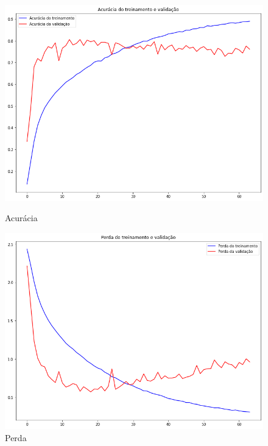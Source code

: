 \documentclass[12pt]{article}
\begin{document}
\begin{figure}[!htb]
  \begin{minipage}{.47\textwidth}
    \centering
    \includegraphics[width=1.1\linewidth]{experiments/default_aug_64/accuracy.png}
    \caption{Acurácia}\label{fig:experiment_default_aug_64_accuracy}
  \end{minipage}\hfill
  \begin{minipage}{.47\textwidth}
    \centering
    \includegraphics[width=1.1\linewidth]{experiments/default_aug_64/loss.png}
    \caption{Perda}\label{fig:experiment_default_aug_64_loss}
  \end{minipage}
\end{figure}
\end{document}
